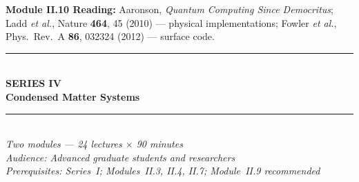 \documentclass[11pt,a4paper]{article}
\begin{document}
\begin{tcolorbox}[highlightbox]
\textbf{Module II.10 Reading:} Aaronson, \textit{Quantum Computing Since Democritus}; Ladd \textit{et al.}, Nature \textbf{464}, 45 (2010) --- physical implementations; Fowler \textit{et al.}, Phys.\ Rev.\ A \textbf{86}, 032324 (2012) --- surface code.
\end{tcolorbox}

\newpage
\thispagestyle{empty}
\pagecolor{darkblue}
\color{white}
\vspace*{2.2cm}
\begin{center}
  {\color{accentgold}\rule{11cm}{1.5pt}}\\[0.5cm]
  {\fontsize{11}{14}\selectfont\bfseries\color{accentgold}\MakeUppercase{Series IV}}\\[0.3cm]
  {\fontsize{26}{32}\selectfont\bfseries Condensed Matter Systems}\\[0.4cm]
  {\color{accentgold}\rule{11cm}{1.5pt}}\\[1.0cm]
  {\large\itshape Two modules --- 24 lectures $\times$ 90 minutes}\\[0.5cm]
  {\normalsize\itshape Audience: Advanced graduate students and researchers}\\[0.3cm]
  {\normalsize\itshape Prerequisites: Series~I; Modules~II.3, II.4, II.7; Module~II.9 recommended}\\[1.6cm]


\end{center}
\end{document}
